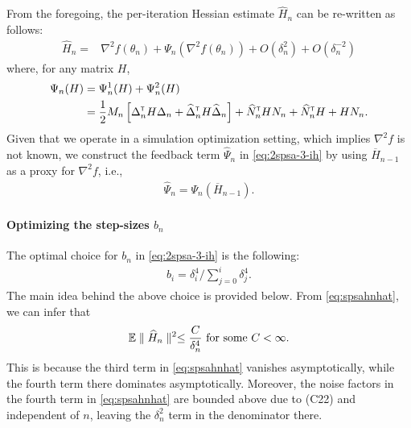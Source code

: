 From the foregoing, the per-iteration Hessian estimate $\widehat H_n$ can be re-written as follows:
\begin{align}
\widehat H_n = & \nabla^2 f(\theta_n) + \Psi_{n}(\nabla^2 f(\theta_n)) +  O(\delta_n^2) + O(\delta_n^{-2})  \label{eq:spsahnhat}
\end{align}
where, for any matrix $H$, 
\begin{align}
\Psi_{n}(H) &=  \Psi_{n}^{1}(H) + \Psi_{n}^{2}(H)\nonumber\\
&=  \frac{1}{2}M_n \left[\Delta_n^\mathsf{\scriptscriptstyle T} H \Delta_n + \widehat\Delta_n^\mathsf{\scriptscriptstyle T} H \widehat\Delta_n\right] + \widehat N_n^\mathsf{\scriptscriptstyle T} H N_n + \widehat N_n^\mathsf{\scriptscriptstyle T} H + H N_n.\label{eq:spsapsi}
\end{align}
Given that we operate in a simulation optimization setting, which implies $\nabla^2 f$ is not known, we construct the feedback term $\widehat \Psi_n$ in \eqref{eq:2spsa-3-ih} by using $\overline H_{n-1}$ as a proxy for $\nabla^2 f$, i.e.,
\begin{align}
\widehat \Psi_n = \Psi_{n} (\overline H_{n-1}).
\label{eq:psinhatspsa3}
\end{align}

\paragraph{\textbf{Optimizing the step-sizes }$b_n$}

The optimal choice for $b_n$ in \eqref{eq:2spsa-3-ih}  is the following:
\begin{align}
\label{eq:spsawieghts}
b_i  = \delta_i^{4}/\sum\limits_{j=0}^{i} \delta_j^{4}.
\end{align}
The main idea behind the above choice is provided below.
From \eqref{eq:spsahnhat}, we can infer that
\begin{align*}
\mathbb{E} \parallel \widehat H_n \parallel^2 \le \dfrac{C}{\delta_n^4} \text{ for some } C<\infty. 
\end{align*} 
This is because the third term in \eqref{eq:spsahnhat} vanishes asymptotically, while the fourth term there dominates asymptotically. Moreover, the noise factors in the fourth term in \eqref{eq:spsahnhat} are bounded above due to (C22)  and independent of $n$, leaving the $\delta_n^2$ term in the denominator there. 

